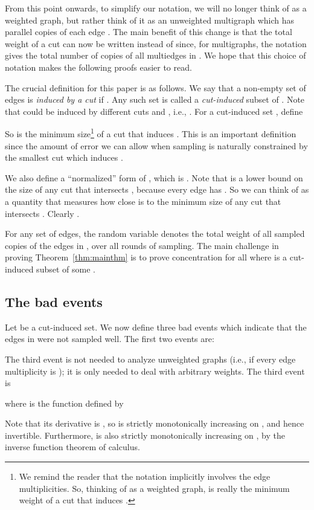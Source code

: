 \documentclass[11pt]{article}
\numberwithin{equation}{section}
\newcommand{\newterm}[1]{\textit{#1}}
\newcommand{\SectionName}[1]{\label{sec:#1}}
\newcommand{\Theorem}[1]{Theorem~\ref{thm:#1}}
\begin{document}
From this point onwards, to simplify our notation, we will no longer think of  as a weighted
graph, but rather think of it as an unweighted multigraph which has
 parallel copies of each edge .
The main benefit of this change is that the total weight of a cut
can now be written  instead of 
since, for multigraphs, the notation  gives
the total number of copies of all multiedges in .
We hope that this choice of notation makes the following proofs easier to read.


The crucial definition for this paper is as follows.
We say that a non-empty set of edges  is 
\newterm{induced by a cut}  if .
Any such set  is called a \newterm{cut-induced} subset of .
Note that  could be induced by different cuts  and ,
i.e., .
For a cut-induced set , define

So  is the minimum size\footnote{We remind the reader that the notation
 implicitly involves the edge multiplicities.
So, thinking of  as a weighted graph,
 is really the minimum weight of a cut that induces .}
of a cut that induces .
This is an important definition since the amount of error we can allow
when sampling  is naturally constrained by the smallest cut which induces .

We also define a ``normalized'' form of , which is .
Note that  is a lower bound on the size of any cut that intersects ,
because every edge  has .
So we can think of  as a quantity that measures how close 
is to the minimum size of any cut that intersects .
Clearly .

For any set  of edges, the random variable  denotes 
the total weight of all sampled copies of the edges in , over all rounds of sampling.
The main challenge in proving \Theorem{mainthm} is to prove concentration for
all  where  is a cut-induced subset of some .

\subsection{The bad events}
\SectionName{badevents}

Let  be a cut-induced set.
We now define three bad events which indicate that the edges in  were not sampled well.
The first two events are:

The third event is not needed to analyze unweighted graphs
(i.e., if every edge multiplicity is );
it is only needed to deal with arbitrary weights.
The third event is

where  is the function defined by

Note that its derivative is ,
so  is strictly monotonically increasing on , and hence invertible.
Furthermore,  is also strictly monotonically increasing on ,
by the inverse function theorem of calculus.
\end{document}
